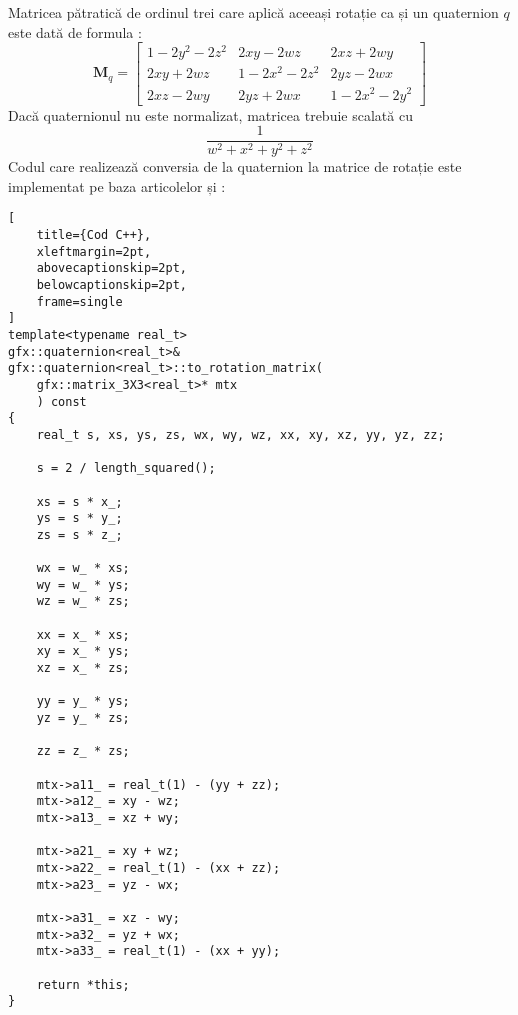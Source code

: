 Matricea pătratică de ordinul trei care aplică aceeași rotație ca și un 
quaternion $q$ este dată de formula :
\begin{equation}
\mathbf{M}_{q} = 
\begin{bmatrix}
1 - 2y^2 - 2z^2 & 2xy - 2wz         & 2xz + 2wy \\
2xy + 2wz       & 1 - 2x^2 - 2z^2   & 2yz - 2wx \\
2xz - 2wy       & 2yz + 2wx         & 1 - 2x^2 - 2y^2
\end{bmatrix}
\end{equation}
Dacă quaternionul nu este normalizat, matricea trebuie scalată cu
\[
\frac{1}{w^2 + x^2 + y^2 + z^2}
\]
Codul care realizează conversia de la quaternion la matrice de rotație este
implementat pe baza articolelor \cite{Shoemake95} și \cite{Shoemake89} :
\begin{lstlisting}[
    title={Cod C++}, 
    xleftmargin=2pt,
    abovecaptionskip=2pt,
    belowcaptionskip=2pt,
    frame=single
]
template<typename real_t>
gfx::quaternion<real_t>&
gfx::quaternion<real_t>::to_rotation_matrix(
    gfx::matrix_3X3<real_t>* mtx
    ) const
{
    real_t s, xs, ys, zs, wx, wy, wz, xx, xy, xz, yy, yz, zz;

    s = 2 / length_squared();

    xs = s * x_;
    ys = s * y_;
    zs = s * z_;

    wx = w_ * xs;
    wy = w_ * ys;
    wz = w_ * zs;

    xx = x_ * xs;
    xy = x_ * ys;
    xz = x_ * zs;

    yy = y_ * ys;
    yz = y_ * zs;

    zz = z_ * zs;

    mtx->a11_ = real_t(1) - (yy + zz);
    mtx->a12_ = xy - wz;
    mtx->a13_ = xz + wy;

    mtx->a21_ = xy + wz;
    mtx->a22_ = real_t(1) - (xx + zz);
    mtx->a23_ = yz - wx;

    mtx->a31_ = xz - wy;
    mtx->a32_ = yz + wx;
    mtx->a33_ = real_t(1) - (xx + yy);

    return *this;
}
\end{lstlisting}

